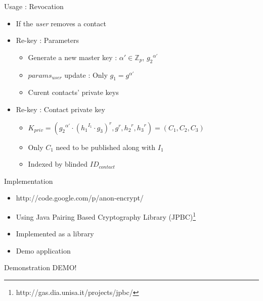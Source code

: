 \documentclass{beamer}
\begin{document}
\begin{frame}{Usage : Revocation}
\begin{itemize}
\item If the \emph{user} removes a contact
\item Re-key : Parameters
\begin{itemize}
\item Generate a new master key : $\alpha' \in \mathbb{Z}_p $,  ${g_2}^{\alpha'}$
\item $params_{user}$ update : Only $g_1 = g^{\alpha'}$ \\
\item Curent contacts' private keys
\end{itemize}
\item Re-key : Contact private key
\begin{itemize}
\item $K_{priv}=({{g_2}^{\alpha'}} \cdot {({{h_1}^{I_1}} \cdot {g_3} )}^r , g^r, {h_2}^r, {h_3}^r) = (C_1, C_2, C_3)$ 
\item Only $C_1$ need to be published along with $I_1$
\item Indexed by blinded $ID_{contact}$
\end{itemize}
\end{itemize}
\end{frame}


\begin{frame}{Implementation}
\begin{itemize}
\item http://code.google.com/p/anon-encrypt/
\item Using Java Pairing Based Cryptography Library (JPBC)\footnote{http://gas.dia.unisa.it/projects/jpbc/}
\item Implemented as a library
\item Demo application
\end{itemize}
\end{frame}

\begin{frame}{Demonstration}
\Huge{DEMO!}
\end{frame}
\end{document}
